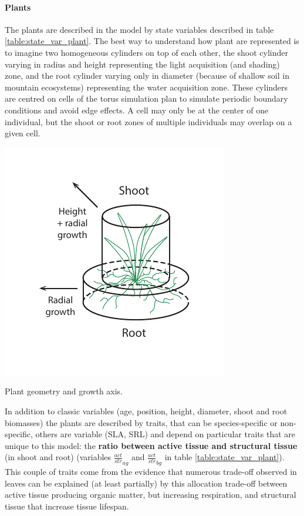 \paragraph{Plants} The plants are described in the model by state variables described in table \ref{table:state_var_plant}. The best way to understand how plant are represented is to imagine two homogeneous cylinders on top of each other, the shoot cylinder varying in radius and height representing the light acquisition (and shading) zone, and the root cylinder varying only in diameter (because of shallow soil in mountain ecosystems) representing the water acquisition zone. These cylinders are centred on cells of the torus simulation plan to simulate periodic boundary conditions and avoid edge effects. A cell may only be at the center of one individual, but the shoot or root zones of multiple individuals may overlap on a given cell.\\
\begin{marginfigure}
\includegraphics{./Figures/plant_geometry_m.pdf}
\caption{Plant geometry and growth axis.}
\end{marginfigure}
\indent In addition to classic variables (age, position, height, diameter, shoot and root biomasses) the plants are described by traits, that can be species-specific or non-specific, others are variable (SLA, SRL) and depend on particular traits that are unique to this model: the \textbf{ratio between active tissue and structural tissue} (in shoot and root) (variables $\frac{act}{str}_{ag}$ and $\frac{act}{str}_{bg}$ in table \ref{table:state_var_plant}). This couple of traits come from the evidence that numerous trade-off observed in leaves can be explained (at least partially) by this allocation trade-off between active tissue producing organic matter, but increasing respiration, and structural tissue that increase tissue lifespan.

